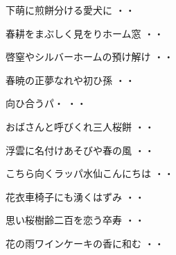 \vspace{0.4cm}
\begin{shiika}下萌に煎餅分ける愛犬に
\hfill{・・}\end{shiika}
\vspace{0.4cm}
\begin{shiika}春耕をまぶしく見をりホーム窓
\hfill{・・}\end{shiika}
\vspace{0.4cm}
\begin{shiika}啓窒やシルバーホームの預け解け
\hfill{・・}\end{shiika}
\vspace{0.4cm}
\begin{shiika}春暁の正夢なれや初ひ孫
\hfill{・・}\end{shiika}
\vspace{0.4cm}
\begin{shiika}向ひ合うパ・
\hfill{・・}\end{shiika}
\vspace{0.4cm}
\begin{shiika}おばさんと呼びくれ三人桜餅
\hfill{・・}\end{shiika}
\vspace{0.4cm}
\begin{shiika}浮雲に名付けあそびや春の風
\hfill{・・}\end{shiika}
\vspace{0.4cm}
\begin{shiika}こちら向くラッパ水仙こんにちは
\hfill{・・}\end{shiika}
\vspace{0.4cm}
\begin{shiika}花衣車椅子にも湧くはずみ
\hfill{・・}\end{shiika}
\vspace{0.4cm}
\begin{shiika}思い桜樹齢二百を恋う卒寿
\hfill{・・}\end{shiika}
\vspace{0.4cm}
\begin{shiika}花の雨ワインケーキの香に和む
\hfill{・・}\end{shiika}
\vspace{0.4cm}
